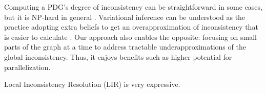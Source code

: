 \documentclass{article} %
\theoremstyle{plain}
\theoremstyle{definition}
\theoremstyle{remark}
\let\cite\citep
\begin{document}
Computing a PDG's degree of inconsistency can be straightforward in some cases, but it is NP-hard in general \citep{pdg-infer}.
Variational inference \citep{blei2017variational,kingma2013autoencoding,jordan1999introduction} can be understood as
   the practice adopting extra beliefs to
   get an over\-approximation of inconsistency that is easier to calculate \cite{one-true-loss}.
Our approach also enables the opposite:
   focusing on small parts of the graph at a time to
   address tractable under\-approximations of the global inconsistency.
Thus, it enjoys benefits such as higher potential for parallelization.

Local Inconsistency Resolution (LIR) is very expressive.




%
%
%
\end{document}
